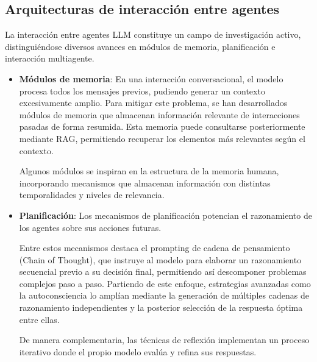 



\subsection{Arquitecturas de interacción entre agentes}
La interacción entre agentes LLM constituye un campo de investigación activo, distinguiéndose diversos avances en módulos de memoria, planificación e interacción multiagente\cite{wang_survey_2024}.
\begin{itemize}
  \item{\textbf{Módulos de memoria}}: En una interacción conversacional, el modelo procesa todos los mensajes previos, pudiendo generar un contexto excesivamente amplio. Para mitigar este problema, se han desarrollados módulos de memoria que almacenan información relevante de interacciones pasadas de forma resumida\cite{zhang_building_2024-1}\cite{fischer_reflective_2023}\cite{liang_unleashing_2023}. Esta memoria puede consultarse posteriormente mediante RAG, permitiendo recuperar los elementos más relevantes según el contexto\cite{zhao_expel_2024}.

Algunos módulos se inspiran en la estructura de la memoria humana\cite{zhong_memorybank_2024}, incorporando mecanismos que almacenan información con distintas temporalidades y niveles de relevancia\cite{wang_survey_2024}\cite{park_generative_2023}.


\item{\textbf{Planificación}}\label{plani}: Los mecanismos de planificación potencian el razonamiento de los agentes sobre sus acciones futuras.

  Entre estos mecanismos destaca el prompting de cadena de pensamiento (Chain of Thought)\cite{wei_chain--thought_2023}, que instruye al modelo para elaborar un razonamiento secuencial previo a su decisión final, permitiendo así descomponer problemas complejos paso a paso.
Partiendo de este enfoque, estrategias avanzadas como la autoconsciencia\cite{liang_unleashing_2023} lo amplían mediante la generación de múltiples cadenas de razonamiento independientes y la posterior selección de la respuesta óptima entre ellas\cite{yao_tree_nodate}\cite{wang_recmind_2024}.

De manera complementaria, las técnicas de reflexión\cite{shinn_reflexion_nodate}\cite{madaan_self-refine_nodate}\cite{miao_selfcheck_2023} implementan un proceso iterativo donde el propio modelo evalúa y refina sus respuestas.


\end{itemize}
